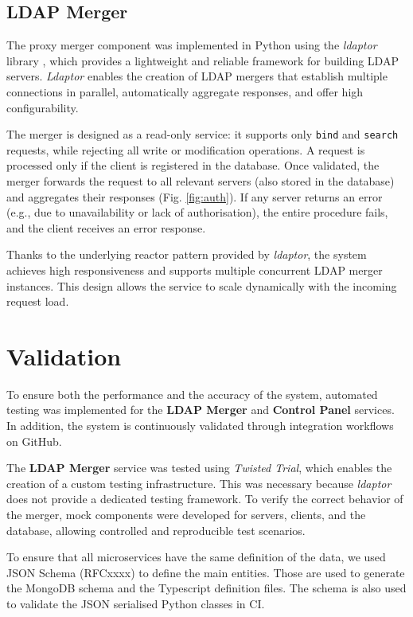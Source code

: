 \documentclass{scrartcl}
\begin{document}
\subsection{LDAP Merger}

\par The proxy merger component was implemented in Python using the \textit{ldaptor} library \cite{ldaptor}, which provides a lightweight and reliable framework for building LDAP servers. \textit{Ldaptor} enables the creation of LDAP mergers that establish multiple connections in parallel, automatically aggregate responses, and offer high configurability.
\par The merger is designed as a read-only service: it supports only \texttt{bind} and \texttt{search} requests, while rejecting all write or modification operations. A request is processed only if the client is registered in the database. Once validated, the merger forwards the request to all relevant servers (also stored in the database) and aggregates their responses (Fig. \ref{fig:auth}). If any server returns an error (e.g., due to unavailability or lack of authorisation), the entire procedure fails, and the client receives an error response.
\par Thanks to the underlying reactor pattern provided by \textit{ldaptor}, the system achieves high responsiveness and supports multiple concurrent LDAP merger instances. This design allows the service to scale dynamically with the incoming request load.

\section{Validation}

\par To ensure both the performance and the accuracy of the system, automated testing was implemented for the \textbf{LDAP Merger} and \textbf{Control Panel} services. In addition, the system is continuously validated through integration workflows on GitHub.
\par The \textbf{LDAP Merger} service was tested using \textit{Twisted Trial}, which enables the creation of a custom testing infrastructure. This was necessary because \textit{ldaptor} does not provide a dedicated testing framework. To verify the correct behavior of the merger, mock components were developed for servers, clients, and the database, allowing controlled and reproducible test scenarios.
\par To ensure that all microservices have the same definition of the data,
we used JSON Schema (RFCxxxx) to define the main entities. Those are used to generate the MongoDB schema and the Typescript
definition files. The schema is also used to validate the JSON serialised Python classes in CI.
\end{document}
